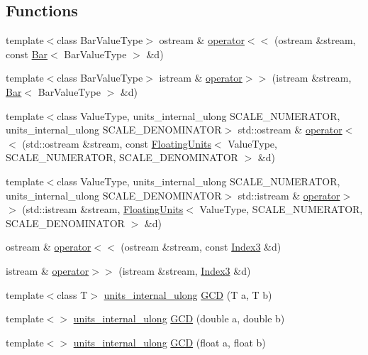 \subsection*{Functions}
\begin{CompactItemize}
\item 
template$<$class Bar\-Value\-Type$>$ ostream \& \hyperlink{namespace_j_g_t_l_c7b88574d9cbabb871f978d45333686d}{operator$<$$<$} (ostream \&stream, const \hyperlink{class_j_g_t_l_1_1_bar}{Bar}$<$ Bar\-Value\-Type $>$ \&d)
\item 
template$<$class Bar\-Value\-Type$>$ istream \& \hyperlink{namespace_j_g_t_l_092a0993d280d2d4dbb45d96e9d40abc}{operator$>$$>$} (istream \&stream, \hyperlink{class_j_g_t_l_1_1_bar}{Bar}$<$ Bar\-Value\-Type $>$ \&d)
\item 
template$<$class Value\-Type, units\_\-internal\_\-ulong SCALE\_\-NUMERATOR, units\_\-internal\_\-ulong SCALE\_\-DENOMINATOR$>$ std::ostream \& \hyperlink{namespace_j_g_t_l_86ab99d9902f6c5772fb0adc0cb2a020}{operator$<$$<$} (std::ostream \&stream, const \hyperlink{class_j_g_t_l_1_1_floating_units}{Floating\-Units}$<$ Value\-Type, SCALE\_\-NUMERATOR, SCALE\_\-DENOMINATOR $>$ \&d)
\item 
template$<$class Value\-Type, units\_\-internal\_\-ulong SCALE\_\-NUMERATOR, units\_\-internal\_\-ulong SCALE\_\-DENOMINATOR$>$ std::istream \& \hyperlink{namespace_j_g_t_l_6c3aa6e2c845fd00bac1728506725fa8}{operator$>$$>$} (std::istream \&stream, \hyperlink{class_j_g_t_l_1_1_floating_units}{Floating\-Units}$<$ Value\-Type, SCALE\_\-NUMERATOR, SCALE\_\-DENOMINATOR $>$ \&d)
\item 
ostream \& \hyperlink{namespace_j_g_t_l_da86017e720d1a0d7bc6ee620e6e798f}{operator$<$$<$} (ostream \&stream, const \hyperlink{class_j_g_t_l_1_1_index3}{Index3} \&d)
\item 
istream \& \hyperlink{namespace_j_g_t_l_2b5020a887bfbfcf78f56c3181a47ace}{operator$>$$>$} (istream \&stream, \hyperlink{class_j_g_t_l_1_1_index3}{Index3} \&d)
\item 
template$<$class T$>$ \hyperlink{namespace_j_g_t_l_1924d6fd42e2d9661bc0b5a5063b99b3}{units\_\-internal\_\-ulong} \hyperlink{namespace_j_g_t_l_5d540b652d4a0d15e83ae5daa5695edd}{GCD} (T a, T b)
\item 
template$<$$>$ \hyperlink{namespace_j_g_t_l_1924d6fd42e2d9661bc0b5a5063b99b3}{units\_\-internal\_\-ulong} \hyperlink{namespace_j_g_t_l_3288a482038d7cc9db66241879178908}{GCD} (double a, double b)
\item 
template$<$$>$ \hyperlink{namespace_j_g_t_l_1924d6fd42e2d9661bc0b5a5063b99b3}{units\_\-internal\_\-ulong} \hyperlink{namespace_j_g_t_l_25c40254ef74d292898efc841fa19182}{GCD} (float a, float b)

\end{CompactItemize}
